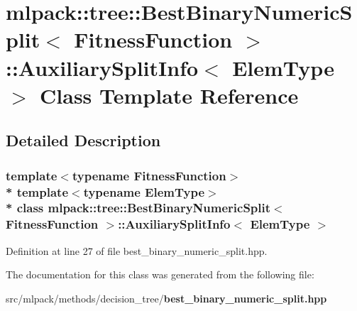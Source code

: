 \section{mlpack\+:\+:tree\+:\+:Best\+Binary\+Numeric\+Split$<$ Fitness\+Function $>$\+:\+:Auxiliary\+Split\+Info$<$ Elem\+Type $>$ Class Template Reference}
\label{classmlpack_1_1tree_1_1BestBinaryNumericSplit_1_1AuxiliarySplitInfo}


\subsection{Detailed Description}
\subsubsection*{template$<$typename Fitness\+Function$>$\\*
template$<$typename Elem\+Type$>$\\*
class mlpack\+::tree\+::\+Best\+Binary\+Numeric\+Split$<$ Fitness\+Function $>$\+::\+Auxiliary\+Split\+Info$<$ Elem\+Type $>$}



Definition at line 27 of file best\+\_\+binary\+\_\+numeric\+\_\+split.\+hpp.



The documentation for this class was generated from the following file\+:\begin{DoxyCompactItemize}
\item 
src/mlpack/methods/decision\+\_\+tree/{\bf best\+\_\+binary\+\_\+numeric\+\_\+split.\+hpp}\end{DoxyCompactItemize}
